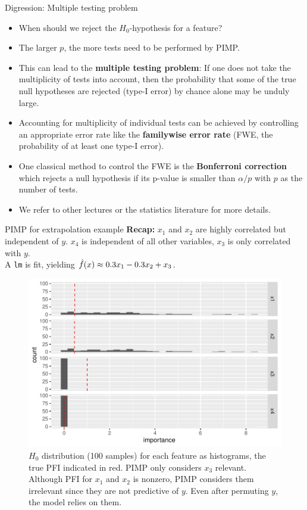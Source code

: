 \documentclass[11pt,compress,t,notes=noshow, aspectratio=169, xcolor=table]{beamer}
\begin{document}
\begin{vbframe}{Digression: Multiple testing problem }
\begin{itemize}
  \item When should we reject the $H_0$-hypothesis for a feature? 
  \item The larger $p$, the more tests need to be performed by PIMP. 
  \item This can lead to the \textbf{multiple testing problem}: If one does not take the multiplicity of tests into account, then the probability that some of the true null hypotheses are rejected (type-I error) by chance alone may be unduly large.
  \item Accounting for multiplicity of individual tests can be achieved by controlling
  an appropriate error rate like the \textbf{familywise error rate} (FWE, the probability of at least one type-I error). 
  \item One classical method to control the FWE is the \textbf{Bonferroni correction} which rejects a null hypothesis if its p-value is smaller than $\alpha/p$ with $p$ as the number of tests. 
  \item We refer to other lectures or the statistics literature for more details.
  \end{itemize} 

\end{vbframe}

\begin{vbframe}{PIMP for extrapolation example}
\textbf{Recap:} $x_1$ and $x_2$ are highly correlated but independent of $y$. $x_4$ is independent of all other variables, $x_3$ is only correlated with $y$.\\
A \texttt{lm} is fit, yielding $\fh(x) \approx 0.3 x_1 - 0.3 x_2 + x_3$.\\
\begin{figure}
  \includegraphics[width=0.45\linewidth]{figure_man/pimp.pdf}
  \caption{$H_0$ distribution (100 samples) for each feature as histograms, the true PFI indicated in red. PIMP only considers $x_3$ relevant. Although PFI for $x_1$ and $x_2$ is nonzero, PIMP considers them irrelevant since they are not predictive of $y$. Even after permuting $y$, the model relies on them.}
\end{figure}
\end{vbframe}


\endlecture
\end{document}
